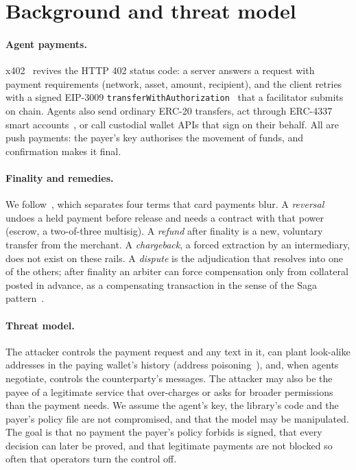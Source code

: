 \documentclass[11pt]{article}
\newcommand{\code}[1]{\texttt{#1}}
\begin{document}
\section{Background and threat model}\label{sec:background}

\paragraph{Agent payments.} x402~\cite{x402} revives the HTTP 402 status code: a server answers a request with payment requirements (network, asset, amount, recipient), and the client retries with a signed EIP-3009 \code{transferWithAuthorization}~\cite{eip3009} that a facilitator submits on chain. Agents also send ordinary ERC-20 transfers, act through ERC-4337 smart accounts~\cite{eip4337}, or call custodial wallet APIs that sign on their behalf. All are push payments: the payer's key authorises the movement of funds, and confirmation makes it final.

\paragraph{Finality and remedies.} We follow~\cite{cacm}, which separates four terms that card payments blur. A \emph{reversal} undoes a held payment before release and needs a contract with that power (escrow, a two-of-three multisig). A \emph{refund} after finality is a new, voluntary transfer from the merchant. A \emph{chargeback}, a forced extraction by an intermediary, does not exist on these rails. A \emph{dispute} is the adjudication that resolves into one of the others; after finality an arbiter can force compensation only from collateral posted in advance, as a compensating transaction in the sense of the Saga pattern~\cite{sagas}.

\paragraph{Threat model.} The attacker controls the payment request and any text in it, can plant look-alike addresses in the paying wallet's history (address poisoning~\cite{poisoning}), and, when agents negotiate, controls the counterparty's messages. The attacker may also be the payee of a legitimate service that over-charges or asks for broader permissions than the payment needs. We assume the agent's key, the library's code and the payer's policy file are not compromised, and that the model may be manipulated. The goal is that no payment the payer's policy forbids is signed, that every decision can later be proved, and that legitimate payments are not blocked so often that operators turn the control off.
\end{document}
